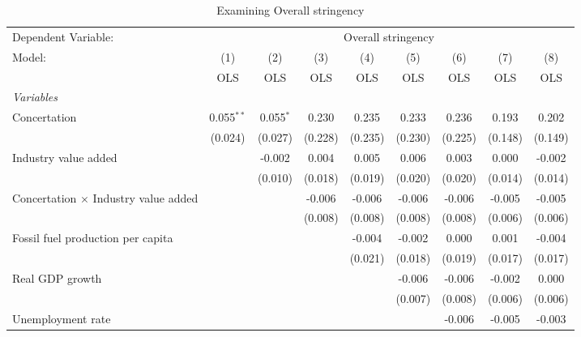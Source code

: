 
\begin{table}[htbp]
   \caption{Examining Overall stringency}
   \centering
   \begin{tabular}{lcccccccc}
      \toprule
      Dependent Variable: & \multicolumn{8}{c}{Overall stringency}\\
      Model:                                      & (1)          & (2)         & (3)     & (4)     & (5)     & (6)     & (7)     & (8)\\  
                                                  &  OLS         & OLS         & OLS     & OLS     & OLS     & OLS     & OLS     & OLS\\  
      \midrule
      \emph{Variables}\\
      Concertation                                & 0.055$^{**}$ & 0.055$^{*}$ & 0.230   & 0.235   & 0.233   & 0.236   & 0.193   & 0.202\\   
                                                  & (0.024)      & (0.027)     & (0.228) & (0.235) & (0.230) & (0.225) & (0.148) & (0.149)\\   
      Industry value added                        &              & -0.002      & 0.004   & 0.005   & 0.006   & 0.003   & 0.000   & -0.002\\   
                                                  &              & (0.010)     & (0.018) & (0.019) & (0.020) & (0.020) & (0.014) & (0.014)\\   
      Concertation $\times$ Industry value added  &              &             & -0.006  & -0.006  & -0.006  & -0.006  & -0.005  & -0.005\\   
                                                  &              &             & (0.008) & (0.008) & (0.008) & (0.008) & (0.006) & (0.006)\\   
      Fossil fuel production per capita           &              &             &         & -0.004  & -0.002  & 0.000   & 0.001   & -0.004\\   
                                                  &              &             &         & (0.021) & (0.018) & (0.019) & (0.017) & (0.017)\\   
      Real GDP growth                             &              &             &         &         & -0.006  & -0.006  & -0.002  & 0.000\\   
                                                  &              &             &         &         & (0.007) & (0.008) & (0.006) & (0.006)\\   
      Unemployment rate                           &              &             &         &         &         & -0.006  & -0.005  & -0.003\\   

\end{tabular}
\end{table}
